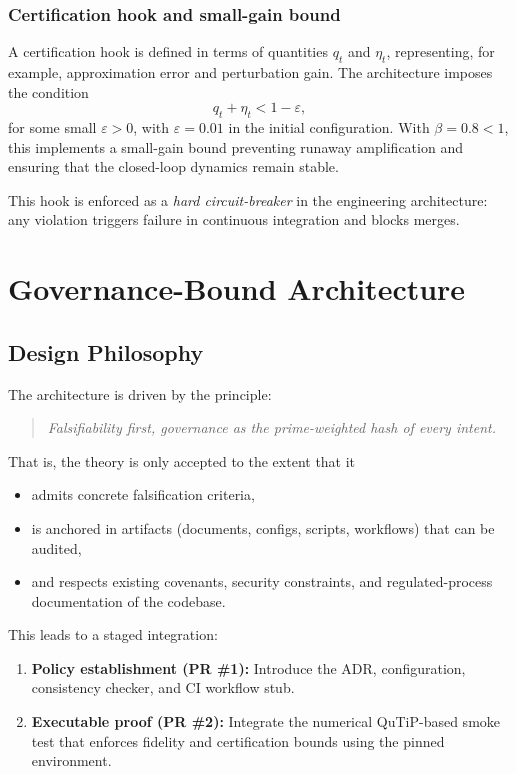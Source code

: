 \documentclass[11pt]{article}
\begin{document}
\subsubsection{Certification hook and small-gain bound}

A certification hook is defined in terms of quantities \(q_t\) and \(\eta_t\), representing, for example, approximation error and perturbation gain. The architecture imposes the condition
\begin{equation}
  q_t + \eta_t < 1 - \varepsilon,
\end{equation}
for some small \(\varepsilon > 0\), with \(\varepsilon = 0.01\) in the initial configuration. With \(\beta = 0.8<1\), this implements a small-gain bound preventing runaway amplification and ensuring that the closed-loop dynamics remain stable.

This hook is enforced as a \emph{hard circuit-breaker} in the engineering architecture: any violation triggers failure in continuous integration and blocks merges.

\section{Governance-Bound Architecture}

\subsection{Design Philosophy}

The architecture is driven by the principle:

\begin{quote}
\emph{Falsifiability first, governance as the prime-weighted hash of every intent.}
\end{quote}

That is, the theory is only accepted to the extent that it
\begin{itemize}[nosep]
  \item admits concrete falsification criteria,
  \item is anchored in artifacts (documents, configs, scripts, workflows) that can be audited,
  \item and respects existing covenants, security constraints, and regulated-process documentation of the codebase.
\end{itemize}

This leads to a staged integration:

\begin{enumerate}[nosep]
  \item \textbf{Policy establishment (PR \#1):} Introduce the ADR, configuration, consistency checker, and CI workflow stub.
  \item \textbf{Executable proof (PR \#2):} Integrate the numerical QuTiP-based smoke test that enforces fidelity and certification bounds using the pinned environment.
\end{enumerate}
\end{document}
